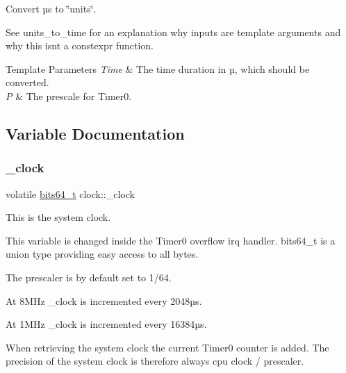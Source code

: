 Convert µs to \char`\"{}units\char`\"{}. 

See units\+\_\+to\+\_\+time for an explanation why inputs are template arguments and why this isn\textquotesingle{}t a constexpr function.


\begin{DoxyTemplParams}{Template Parameters}
{\em Time} & The time duration in µ, which should be converted. \\
\hline
{\em P} & The prescale for {\ttfamily Timer0}. \\
\hline
\end{DoxyTemplParams}


\subsection{Variable Documentation}
\hypertarget{namespaceclock_a0cfce972d3684eddb3dd61bb0baaf225}{}\label{namespaceclock_a0cfce972d3684eddb3dd61bb0baaf225} 
\subsubsection{\texorpdfstring{\+\_\+clock}{\_clock}}
{\footnotesize\ttfamily volatile \hyperlink{unionbits64__s}{bits64\+\_\+t} clock\+::\+\_\+clock}



This is the system clock. 

This variable is changed inside the {\ttfamily Timer0} overflow irq handler. {\ttfamily bits64\+\_\+t} is a union type providing easy access to all bytes.

The prescaler is by default set to 1/64.
\begin{DoxyItemize}
\item At 8\+M\+Hz \+\_\+clock is incremented every 2\textquotesingle{}048µs.
\item At 1\+M\+Hz \+\_\+clock is incremented every 16\textquotesingle{}384µs.
\end{DoxyItemize}

When retrieving the system clock the current {\ttfamily Timer0} counter is added. The precision of the system clock is therefore always cpu clock / prescaler. 
